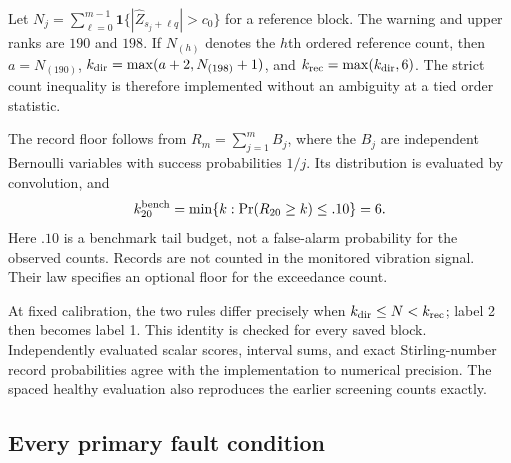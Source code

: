 \documentclass[11pt]{article}
\theoremstyle{definition}
\theoremstyle{remark}
\newcommand{\1}{\mathbf 1}
\begin{document}
Let \(N_j=\sum_{\ell=0}^{m-1}\mathbf1\{|\widehat Z_{s_j+\ell q}|>c_0\}\) for a reference block. The warning and upper ranks are \(190\) and \(198\). If \(N_{(h)}\) denotes the \(h\)th ordered reference count, then \(a=N_{(190)}\), \(k_{\rm dir}=\max(a+2,N_{(198)}+1)\), and \(k_{\rm rec}=\max(k_{\rm dir},6)\). The strict count inequality is therefore implemented without an ambiguity at a tied order statistic.

The record floor follows from \(R_m=\sum_{j=1}^m B_j\), where the \(B_j\) are independent Bernoulli variables with success probabilities \(1/j\). Its distribution is evaluated by convolution, and
\[
 k^{\rm bench}_{20}=\min\{k:\Pr(R_{20}\ge k)\le .10\}=6.
\]
Here \(.10\) is a benchmark tail budget, not a false-alarm probability for the observed counts. Records are not counted in the monitored vibration signal. Their law specifies an optional floor for the exceedance count.

At fixed calibration, the two rules differ precisely when \(k_{\rm dir}\le N<k_{\rm rec}\); label 2 then becomes label 1. This identity is checked for every saved block. Independently evaluated scalar scores, interval sums, and exact Stirling-number record probabilities agree with the implementation to numerical precision. The spaced healthy evaluation also reproduces the earlier screening counts exactly.

\clearpage
\subsection{Every primary fault condition}
\end{document}
